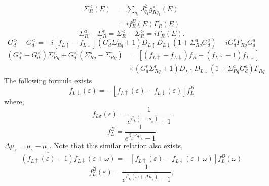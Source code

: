 \documentclass[11pt,a4paper]{article}
\begin{document}
\begin{equation}
\begin{split}
\Sigma_{R}^{<}(E) &=  \sum_{q_{1}}J_{q_{1}}^{2} g_{Rq_{1}}^{<}(E) \\
&= if_{R}^{B}(E) \Gamma_{R}(E)
\end{split}
\end{equation}
\begin{equation}
\Sigma_{R}^{a} - \Sigma_{R}^{r} = \Sigma_{R}^{<} - \Sigma_{R}^{>} = i\Gamma_{R}(E).
\end{equation}
\begin{equation}
G_{d}^{>}-G_{d}^{<}=-i\left[f_{L \uparrow}-f_{L \downarrow}\right]\left(G_{d}^{r} \Sigma_{R q}^{r}+1\right) D_{L \uparrow} D_{L \downarrow}\left(1+\Sigma_{R q}^{a} G_{d}^{a}\right)-i G_{d}^{r} \Gamma_{R q} G_{d}^{a}
\end{equation}
\begin{equation}
\begin{aligned}
\left(G_{d}^{>}-G_{d}^{<}\right) \Sigma_{R q}^{<}+G_{d}^{<}\left(\Sigma_{R q}^{a}-\Sigma_{R q}^{r}\right) &=\left[\left(f_{L \uparrow}-f_{L \downarrow}\right) f_{R}+\left(f_{L \uparrow}-1\right) f_{L \downarrow}\right] \\ & \times\left(G_{d}^{r} \Sigma_{R q}^{r}+1\right) D_{L \uparrow} D_{L \downarrow}\left(1+\Sigma_{R q}^{a} G_{d}^{a}\right) \Gamma_{R q} 
\end{aligned}
\label{eq:diff}
\end{equation}
The following formula exists
\begin{equation}
[f_{L \uparrow}(\varepsilon)-1] f_{L \downarrow}(\varepsilon) =-[f_{L \uparrow}(\varepsilon) -f_{L \downarrow}(\varepsilon)] f_{L}^{B}
\end{equation}
where,
\begin{equation}
f_{L \sigma}(\epsilon)=\frac{1}{e^{\beta_{L}(\epsilon-\mu_{\sigma})}+1}
\end{equation}
\begin{equation}
f_{L}^{B}= \frac{1}{e^{\beta_{L}\Delta \mu_{s}}-1 }
\end{equation}
$\Delta\mu_{s}=\mu_{\uparrow}-\mu_{\downarrow}$. Note that this similar relation also exists,
\begin{equation}
\left(f_{L \uparrow}(\varepsilon)-1\right) f_{L \downarrow}(\varepsilon+\omega)=-[f_{L \uparrow}(\varepsilon) - f_{L \downarrow}(\varepsilon+\omega)] f_{L}^{B}(\omega)
\end{equation}
\begin{equation}
f_{L}^{B}(\varepsilon) = \frac{1}{e^{\beta_{L}(\omega+\Delta \mu_{s})}-1 },
\end{equation}
\end{document}
